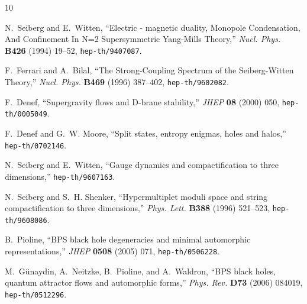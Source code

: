 \documentclass[12pt,reqno]{article}
\numberwithin{equation}{section}
\numberwithin{equation}{section}
\begin{document}
%
%

\providecommand{\href}[2]{#2}\begingroup\raggedright\begin{thebibliography}{10}

N.~Seiberg and E.~Witten, ``{Electric - magnetic duality, Monopole
  Condensation, And Confinement In N=2 Supersymmetric Yang-Mills Theory},''
  {\em Nucl. Phys.} {\bf B426} (1994) 19--52,
\href{http://www.arXiv.org/abs/hep-th/9407087}{{\tt hep-th/9407087}}.

F.~Ferrari and A.~Bilal, ``{The Strong-Coupling Spectrum of the Seiberg-Witten
  Theory},'' {\em Nucl. Phys.} {\bf B469} (1996) 387--402,
\href{http://www.arXiv.org/abs/hep-th/9602082}{{\tt hep-th/9602082}}.

F.~Denef, ``{S}upergravity flows and {D}-brane stability,'' {\em JHEP} {\bf 08}
  (2000) 050,
\href{http://www.arXiv.org/abs/hep-th/0005049}{{\tt hep-th/0005049}}.

F.~Denef and G.~W. Moore, ``Split states, entropy enigmas, holes and halos,''
\href{http://www.arXiv.org/abs/hep-th/0702146}{{\tt hep-th/0702146}}.

N.~Seiberg and E.~Witten, ``Gauge dynamics and compactification to three
  dimensions,''
\href{http://www.arXiv.org/abs/hep-th/9607163}{{\tt hep-th/9607163}}.

N.~Seiberg and S.~H. Shenker, ``Hypermultiplet moduli space and string
  compactification to three dimensions,'' {\em Phys. Lett.} {\bf B388} (1996)
  521--523,
\href{http://www.arXiv.org/abs/hep-th/9608086}{{\tt hep-th/9608086}}.

B.~Pioline, ``{BPS} black hole degeneracies and minimal automorphic
  representations,'' {\em JHEP} {\bf 0508} (2005) 071,
\href{http://www.arXiv.org/abs/hep-th/0506228}{{\tt hep-th/0506228}}.

M.~G\"unaydin, A.~Neitzke, B.~Pioline, and A.~Waldron, ``{BPS} black holes,
  quantum attractor flows and automorphic forms,'' {\em Phys. Rev.} {\bf D73}
  (2006) 084019,
\href{http://www.arXiv.org/abs/hep-th/0512296}{{\tt hep-th/0512296}}.


\end{thebibliography}
\end{document}
